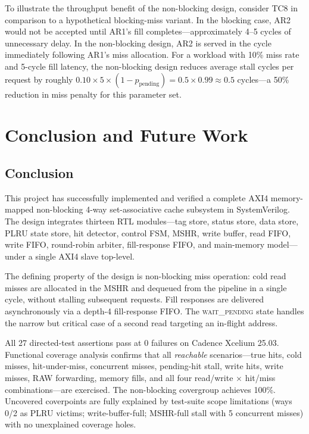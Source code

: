 \documentclass[12pt,letterpaper]{report}
\begin{document}
To illustrate the throughput benefit of the non-blocking design,
consider TC8 in comparison to a hypothetical blocking-miss variant.
In the blocking case, AR2 would not be accepted until AR1's fill
completes---approximately 4--5 cycles of unnecessary delay.  In the
non-blocking design, AR2 is served in the cycle immediately following
AR1's miss allocation.  For a workload with 10\% miss rate and 5-cycle
fill latency, the non-blocking design reduces average stall cycles per
request by roughly $0.10 \times 5 \times (1 - p_{\text{pending}}) =
0.5 \times 0.99 \approx 0.5$ cycles---a 50\% reduction in miss
penalty for this parameter set.

\chapter{Conclusion and Future Work}
\label{ch:conclusion}

\section{Conclusion}

This project has successfully implemented and verified a complete AXI4
memory-mapped non-blocking 4-way set-associative cache subsystem in
SystemVerilog.  The design integrates thirteen RTL modules---tag
store, status store, data store, PLRU state store, hit detector,
control FSM, MSHR, write buffer, read FIFO, write FIFO, round-robin
arbiter, fill-response FIFO, and main-memory model---under a single
AXI4 slave top-level.

The defining property of the design is non-blocking miss operation:
cold read misses are allocated in the MSHR and dequeued from the
pipeline in a single cycle, without stalling subsequent requests.
Fill responses are delivered asynchronously via a depth-4
fill-response FIFO.  The \textsc{wait\_pending} state handles the
narrow but critical case of a second read targeting an in-flight
address.

All 27 directed-test assertions pass at 0 failures on Cadence Xcelium
25.03.  Functional coverage analysis confirms that all
\emph{reachable} scenarios---true hits, cold misses, hit-under-miss,
concurrent misses, pending-hit stall, write hits, write misses, RAW
forwarding, memory fills, and all four read/write $\times$ hit/miss
combinations---are exercised.  The non-blocking covergroup achieves
100\%.  Uncovered coverpoints are fully explained by test-suite scope
limitations (ways 0/2 as PLRU victims; write-buffer-full; MSHR-full
stall with 5 concurrent misses) with no unexplained coverage holes.
\end{document}
